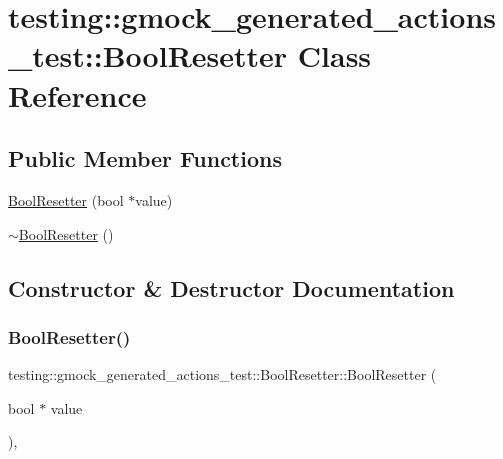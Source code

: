 \hypertarget{classtesting_1_1gmock__generated__actions__test_1_1_bool_resetter}{}\section{testing\+:\+:gmock\+\_\+generated\+\_\+actions\+\_\+test\+:\+:Bool\+Resetter Class Reference}
\label{classtesting_1_1gmock__generated__actions__test_1_1_bool_resetter}
\subsection*{Public Member Functions}
\begin{DoxyCompactItemize}
\item 
\hyperlink{classtesting_1_1gmock__generated__actions__test_1_1_bool_resetter_a55776cb9ef3b358e48898bb0257646ea}{Bool\+Resetter} (bool $\ast$value)
\item 
\hyperlink{classtesting_1_1gmock__generated__actions__test_1_1_bool_resetter_a814afb883394b0fe7d7c8c1aa22d9cb6}{$\sim$\+Bool\+Resetter} ()
\end{DoxyCompactItemize}


\subsection{Constructor \& Destructor Documentation}
\mbox{\label{classtesting_1_1gmock__generated__actions__test_1_1_bool_resetter_a55776cb9ef3b358e48898bb0257646ea}} 
\subsubsection{\texorpdfstring{Bool\+Resetter()}{BoolResetter()}}
{\footnotesize\ttfamily testing\+::gmock\+\_\+generated\+\_\+actions\+\_\+test\+::\+Bool\+Resetter\+::\+Bool\+Resetter (\begin{DoxyParamCaption}\item[{bool $\ast$}]{value }\end{DoxyParamCaption})\hspace{0.3cm}{\ttfamily [inline]}, {\ttfamily [explicit]}}

